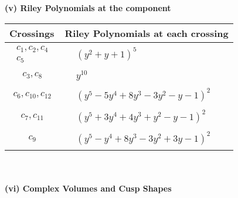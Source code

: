 \documentclass[1p]{elsarticle_modified}
\theoremstyle{definition}
\begin{document}
\newpage\renewcommand{\arraystretch}{1}
\flushleft \textbf{(v) Riley Polynomials at the component}\newline \\
\begin{tabular}{m{50pt}|m{274pt}}
Crossings & \hspace{64pt}Riley Polynomials at each crossing \\
\hline $$\begin{aligned}c_{1},c_{2},c_{4}\\c_{5}\end{aligned}$$&$\begin{aligned}
&(y^2+y+1)^5
\end{aligned}$\\
\hline $$\begin{aligned}c_{3},c_{8}\end{aligned}$$&$\begin{aligned}
&y^{10}
\end{aligned}$\\
\hline $$\begin{aligned}c_{6},c_{10},c_{12}\end{aligned}$$&$\begin{aligned}
&(y^5-5 y^4+8 y^3-3 y^2- y-1)^2
\end{aligned}$\\
\hline $$\begin{aligned}c_{7},c_{11}\end{aligned}$$&$\begin{aligned}
&(y^5+3 y^4+4 y^3+y^2- y-1)^2
\end{aligned}$\\
\hline $$\begin{aligned}c_{9}\end{aligned}$$&$\begin{aligned}
&(y^5- y^4+8 y^3-3 y^2+3 y-1)^2
\end{aligned}$\\
\hline
\end{tabular}\\~\\
\newpage\flushleft \textbf{(vi) Complex Volumes and Cusp Shapes}
\end{document}
